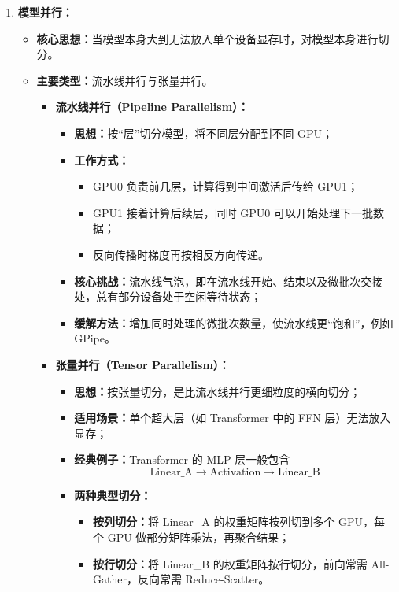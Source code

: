\documentclass[../main.tex]{subfiles}
\begin{document}
\begin{enumerate}
    \item \textbf{模型并行：}
    \begin{itemize}
        \item \textbf{核心思想：}当模型本身大到无法放入单个设备显存时，对模型本身进行切分。
        \item \textbf{主要类型：}流水线并行与张量并行。
        \begin{itemize}
            \item \textbf{流水线并行（Pipeline Parallelism）：}
            \begin{itemize}
                \item \textbf{思想：}按“层”切分模型，将不同层分配到不同 GPU；
                \item \textbf{工作方式：}
                \begin{itemize}
                    \item GPU0 负责前几层，计算得到中间激活后传给 GPU1；
                    \item GPU1 接着计算后续层，同时 GPU0 可以开始处理下一批数据；
                    \item 反向传播时梯度再按相反方向传递。
                \end{itemize}
                \item \textbf{核心挑战：}流水线气泡，即在流水线开始、结束以及微批次交接处，总有部分设备处于空闲等待状态；
                \item \textbf{缓解方法：}增加同时处理的微批次数量，使流水线更“饱和”，例如 GPipe。
            \end{itemize}

            \item \textbf{张量并行（Tensor Parallelism）：}
            \begin{itemize}
                \item \textbf{思想：}按张量切分，是比流水线并行更细粒度的横向切分；
                \item \textbf{适用场景：}单个超大层（如 Transformer 中的 FFN 层）无法放入显存；
                \item \textbf{经典例子：}Transformer 的 MLP 层一般包含
                $$
                \text{Linear\_A} \rightarrow \text{Activation} \rightarrow \text{Linear\_B}
                $$
                \item \textbf{两种典型切分：}
                \begin{itemize}
                    \item \textbf{按列切分：}将 Linear\_A 的权重矩阵按列切到多个 GPU，每个 GPU 做部分矩阵乘法，再聚合结果；
                    \item \textbf{按行切分：}将 Linear\_B 的权重矩阵按行切分，前向常需 All-Gather，反向常需 Reduce-Scatter。
                \end{itemize}
            \end{itemize}
        \end{itemize}
    \end{itemize}


\end{enumerate}
\end{document}
